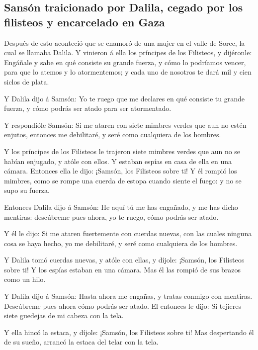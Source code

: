 \hypertarget{sansuxf3n-traicionado-por-dalila-cegado-por-los-filisteos-y-encarcelado-en-gaza}{%
\subsection{Sansón traicionado por Dalila, cegado por los filisteos y
encarcelado en
Gaza}\label{sansuxf3n-traicionado-por-dalila-cegado-por-los-filisteos-y-encarcelado-en-gaza}}

 Después de esto aconteció que se enamoró de una mujer en
el valle de Sorec, la cual se llamaba Dalila.  Y vinieron
á ella los príncipes de los Filisteos, y dijéronle: Engáñale y sabe en
qué consiste su grande fuerza, y cómo lo podríamos vencer, para que lo
atemos y lo atormentemos; y cada uno de nosotros te dará mil y cien
siclos de plata.

 Y Dalila dijo á Samsón: Yo te ruego que me declares en
qué consiste tu grande fuerza, y cómo podrás ser atado para ser
atormentado.

 Y respondióle Samsón: Si me ataren con siete mimbres
verdes que aun no estén enjutos, entonces me debilitaré, y seré como
cualquiera de los hombres.

 Y los príncipes de los Filisteos le trajeron siete
mimbres verdes que aun no se habían enjugado, y atóle con ellos.
 Y estaban espías en casa de ella en una cámara. Entonces
ella le dijo: ¡Samsón, los Filisteos sobre ti! Y él rompió los mimbres,
como se rompe una cuerda de estopa cuando siente el fuego: y no se supo
su fuerza.

 Entonces Dalila dijo á Samsón: He aquí tú me has
engañado, y me has dicho mentiras: descúbreme pues ahora, yo te ruego,
cómo podrás ser atado.

 Y él le dijo: Si me ataren fuertemente con cuerdas
nuevas, con las cuales ninguna cosa se haya hecho, yo me debilitaré, y
seré como cualquiera de los hombres.

 Y Dalila tomó cuerdas nuevas, y atóle con ellas, y
díjole: ¡Samsón, los Filisteos sobre ti! Y los espías estaban en una
cámara. Mas él las rompió de sus brazos como un hilo.

 Y Dalila dijo á Samsón: Hasta ahora me engañas, y tratas
conmigo con mentiras. Descúbreme pues ahora cómo podrás ser atado. El
entonces le dijo: Si tejieres siete guedejas de mi cabeza con la tela.

 Y ella hincó la estaca, y díjole: ¡Samsón, los Filisteos
sobre ti! Mas despertando él de su sueño, arrancó la estaca del telar
con la tela.

